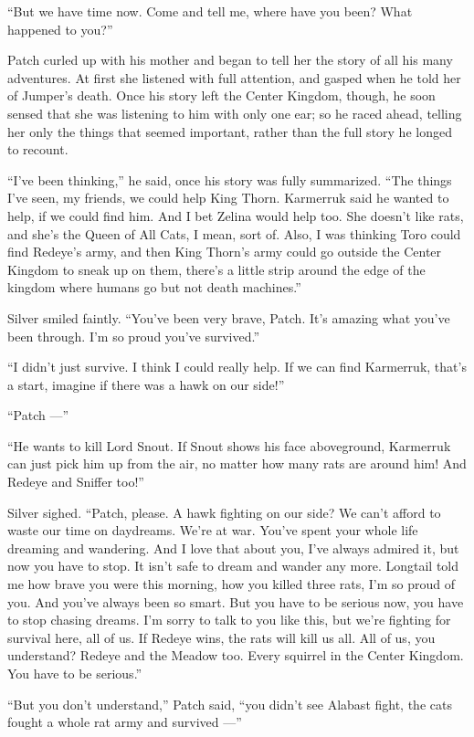 \documentclass[12pt]{memoir}
\begin{document}
“But we have time now. Come and tell me, where have you been? What
happened to you?”

Patch curled up with his mother and began to tell her the story of all
his many adventures. At first she listened with full attention, and
gasped when he told her of Jumper’s death. Once his story left the
Center Kingdom, though, he soon sensed that she was listening to him
with only one ear; so he raced ahead, telling her only the things that
seemed important, rather than the full story he longed to recount.

“I’ve been thinking,” he said, once his story was fully
summarized. “The things I’ve seen, my friends, we could help King
Thorn. Karmerruk said he wanted to help, if we could find him. And I
bet Zelina would help too. She doesn’t like rats, and she’s the Queen
of All Cats, I mean, sort of. Also, I was thinking Toro could find
Redeye’s army, and then King Thorn’s army could go outside the Center
Kingdom to sneak up on them, there’s a little strip around the edge of
the kingdom where humans go but not death machines.”

Silver smiled faintly. “You’ve been very brave, Patch. It’s amazing
what you’ve been through. I’m so proud you’ve survived.”

“I didn’t just survive. I think I could really help. If we can find
Karmerruk, that’s a start, imagine if there was a hawk on our side!”

“Patch —”

“He wants to kill Lord Snout. If Snout shows his face aboveground,
Karmerruk can just pick him up from the air, no matter how many rats
are around him! And Redeye and Sniffer too!”

Silver sighed. “Patch, please. A hawk fighting on our side? We can’t
afford to waste our time on daydreams. We’re at war. You’ve spent your
whole life dreaming and wandering. And I love that about you, I’ve
always admired it, but now you have to stop. It isn’t safe to dream
and wander any more. Longtail told me how brave you were this morning,
how you killed three rats, I’m so proud of you. And you’ve always been
so smart. But you have to be serious now, you have to stop chasing
dreams. I’m sorry to talk to you like this, but we’re fighting for
survival here, all of us. If Redeye wins, the rats will kill us
all. All of us, you understand? Redeye and the Meadow too. Every
squirrel in the Center Kingdom. You have to be serious.”

“But you don’t understand,” Patch said, “you didn’t see Alabast fight,
the cats fought a whole rat army and survived —”
\end{document}
